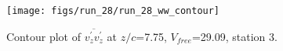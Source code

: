 \begin{figure}[H]
\centering
\texttt{[image: figs/run\_28/run\_28\_ww\_contour]}
\caption{Contour plot of $\overline{v_{z}^{\prime} v_{z}^{\prime}}$ at $z/c$=7.75, $V_{free}$=29.09, station 3.}
\label{fig:run_28_ww_contour}
\end{figure}



